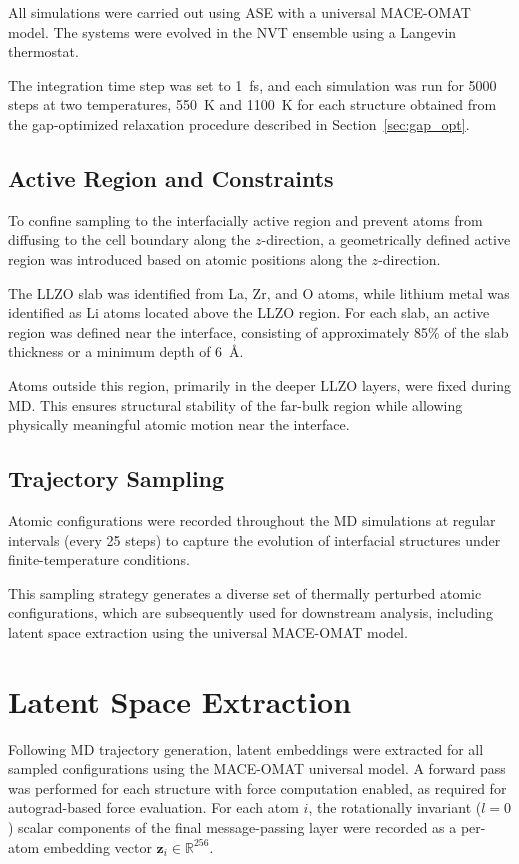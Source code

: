 \documentclass[12pt,a4paper,oneside]{book}
\begin{document}
All simulations were carried out using ASE with a universal MACE-OMAT model.
The systems were evolved in the NVT ensemble using a Langevin thermostat.

The integration time step was set to 1~fs, and each simulation was run for
5000 steps at two temperatures, 550~K and 1100~K for each structure obtained from the gap-optimized relaxation procedure described in
Section~\ref{sec:gap_opt}.

\subsection{Active Region and Constraints}

To confine sampling to the interfacially active region and prevent atoms from
diffusing to the cell boundary along the $z$-direction, a geometrically defined active region
was introduced based on atomic positions along the $z$-direction.

The LLZO slab was identified from La, Zr, and O atoms, while lithium metal
was identified as Li atoms located above the LLZO region. For each slab, an
active region was defined near the interface, consisting of approximately
85\% of the slab thickness or a minimum depth of 6~\AA.

Atoms outside this region, primarily in the deeper LLZO layers, were fixed
during MD. This ensures structural stability of the far-bulk region while allowing
physically meaningful atomic motion near the interface.

\subsection{Trajectory Sampling}

Atomic configurations were recorded throughout the MD simulations at regular
intervals (every 25 steps) to capture the evolution of interfacial structures
under finite-temperature conditions.

This sampling strategy generates a diverse set of thermally perturbed atomic
configurations, which are subsequently used for downstream
analysis, including latent space extraction using the universal MACE-OMAT model.

\section{Latent Space Extraction}
\label{sec:latent_extraction}

Following MD trajectory generation, latent embeddings were extracted for all
sampled configurations using the MACE-OMAT universal model. A forward pass
was performed for each structure with force computation enabled, as required
for autograd-based force evaluation. For each atom $i$, the rotationally
invariant ($l = 0$) scalar components of the final message-passing layer were
recorded as a per-atom embedding vector $\mathbf{z}_i \in \mathbb{R}^{256}$.
\end{document}
